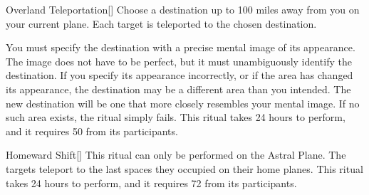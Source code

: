 \lowercase{\hypertarget{spell:Overland Teleportation}{}}\label{spell:Overland Teleportation}
\begin{freeability}[Rank 5]{\hypertarget{spell:Overland Teleportation}{Overland Teleportation}}[]
Choose a destination up to 100 miles away from you on your current plane.
Each target is teleported to the chosen destination.

You must specify the destination with a precise mental image of its appearance.
The image does not have to be perfect, but it must unambiguously identify the destination.
If you specify its appearance incorrectly, or if the area has changed its appearance, the destination may be a different area than you intended.
The new destination will be one that more closely resembles your mental image.
If no such area exists, the ritual simply fails.
This ritual takes 24 hours to perform, and it requires 50  from its participants.
\end{freeability}
\vspace{0.25em}



\lowercase{\hypertarget{spell:Homeward Shift}{}}\label{spell:Homeward Shift}
\begin{freeability}[Rank 6]{\hypertarget{spell:Homeward Shift}{Homeward Shift}}[]
This ritual can only be performed on the Astral Plane.
The targets teleport to the last spaces they occupied on their home planes.
This ritual takes 24 hours to perform, and it requires 72  from its participants.
\end{freeability}
\vspace{0.25em}



